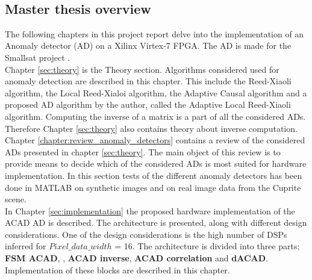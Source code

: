 
\\





\newpage
\subsection{Master thesis overview}
The following chapters in this project report delve into the implementation of an Anomaly detector (AD) on a Xilinx Virtex-7 FPGA. The AD is made for the Smallsat project \cite{SmallSat_project_description}. \\  

Chapter \ref{sec:theory} is the Theory section. Algorithms considered used for anomaly detection are described in this chapter. This include the Reed-Xiaoli algorithm, the Local Reed-Xialoi algorithm, the Adaptive Causal algorithm and a proposed AD algorithm by the author, called the Adaptive Local Reed-Xiaoli algorithm. Computing the inverse of a matrix is a part of all the considered ADs. Therefore Chapter \ref{sec:theory} also contains theory about inverse computation.\\%


Chapter \ref{chapter:review_anomaly_detectors} contains a review of the considered ADs presented in chapter \ref{sec:theory}. The main object of this review is to provide means to decide which of the considered ADs is most suited for hardware implementation. In this section tests of the different anomaly detectors has been done in MATLAB on synthetic images and on real image data from the Cuprite scene.\\  

In Chapter \ref{sec:implementation} the proposed hardware implementation of the ACAD AD is described. The architecture is presented, along with different design considerations. One of the design considerations is the high number of DSPs inferred for $Pixel\_data\_width$ = 16. The architecture is divided into three parts; \textbf{FSM ACAD}, , \textbf{ACAD inverse}, \textbf{ACAD correlation} and \textbf{dACAD}. Implementation of these blocks are described in this chapter. \\

